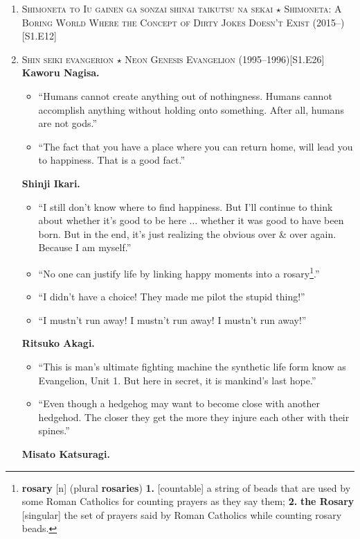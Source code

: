 \documentclass{article}
\numberwithin{equation}{section}
\begin{document}
\begin{enumerate}
    Rascal Does Not Dream of Bunny Girl Senpai (2018--)\hfill[S1.E14]
    \item \textsc{Shimoneta to Iu gainen ga sonzai shinai taikutsu na sekai $\star$ Shimoneta: A Boring World Where the Concept of Dirty Jokes Doesn't Exist} (2015--)\hfill[S1.E12]
    \item \textsc{Shin seiki evangerion $\star$ Neon Genesis Evangelion} (1995--1996)\hfill[S1.E26]
    \textbf{Kaworu Nagisa.}
	\begin{itemize}
   		\item ``Humans cannot create anything out of nothingness. Humans cannot accomplish anything without holding onto something. After all, humans are not gods.''
   		\item ``The fact that you have a place where you can return home, will lead you to happiness. That is a good fact.''
   	\end{itemize}
    \textbf{Shinji Ikari.}
    \begin{itemize}
    	\item ``I still don't know where to find happiness. But I'll continue to think about whether it's good to be here $\ldots$ whether it was good to have been born. But in the end, it's just realizing the obvious over \& over again. Because I am myself.''
    	\item ``No one can justify life by linking happy moments into a rosary\footnote{\textbf{rosary} [n] (plural \textbf{rosaries}) \textbf{1.} [countable] a string of beads that are used by some Roman Catholics for counting prayers as they say them; \textbf{2.} \textbf{the Rosary} [singular] the set of prayers said by Roman Catholics while counting rosary beads.}.''
    	\item ``I didn't have a choice! They made me pilot the stupid thing!''
    	\item ``I mustn't run away! I mustn't run away! I mustn't run away!''
    \end{itemize}
	\textbf{Ritsuko Akagi.}
	\begin{itemize}
		\item ``This is man's ultimate fighting machine the synthetic life form know as Evangelion, Unit 1. But here in secret, it is mankind's last hope.''
		\item ``Even though a hedgehog may want to become close with another hedgehod. The closer they get the more they injure each other with their spines.''
	\end{itemize}
	\textbf{Misato Katsuragi.}
	\begin{itemize}

\end{itemize}
\end{enumerate}
\end{document}
